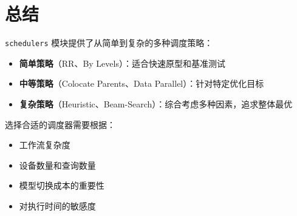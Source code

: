 \documentclass[12pt,a4paper]{article}
\begin{document}
\section{总结}

\texttt{schedulers} 模块提供了从简单到复杂的多种调度策略：

\begin{itemize}
    \item \textbf{简单策略}（RR、By Levels）：适合快速原型和基准测试
    \item \textbf{中等策略}（Colocate Parents、Data Parallel）：针对特定优化目标
    \item \textbf{复杂策略}（Heuristic、Beam-Search）：综合考虑多种因素，追求整体最优
\end{itemize}

选择合适的调度器需要根据：
\begin{itemize}
    \item 工作流复杂度
    \item 设备数量和查询数量
    \item 模型切换成本的重要性
    \item 对执行时间的敏感度
\end{itemize}
\end{document}
